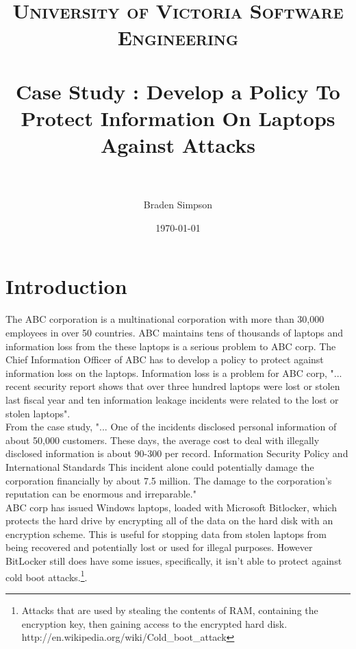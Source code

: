 \documentclass[paper=a4, fontsize=11pt]{scrartcl} %
\title{	
\normalfont \normalsize 
\textsc{University of Victoria Software Engineering} \\ [25pt] %
\horrule{0.5pt} \\[0.4cm] %
\huge Case Study : Develop a Policy To Protect Information On Laptops Against Attacks  \\ %
\horrule{2pt} \\[0.5cm] %
}
\author{Braden Simpson} %
\date{\normalsize\today} %
\numberwithin{equation}{section} %
\numberwithin{figure}{section} %
\numberwithin{table}{section} %
\begin{document}
\maketitle %


\section{Introduction}

The ABC corporation is a multinational corporation with more than 30,000 employees in over 50 countries.  ABC maintains tens of thousands of laptops and information loss from the these laptops is a serious problem to ABC corp.  The Chief Information Officer of ABC has to develop a policy to protect against information loss on the laptops.  Information loss is a problem for ABC corp, "...  recent security report shows that over three 
hundred laptops were lost or stolen last fiscal year and ten information leakage incidents 
were related to the lost or stolen laptops".\\

From the case study, "... One of the incidents disclosed personal information of about 50,000 customers. These days, 
the average cost to deal with illegally disclosed information is about 90-300 per record. Information Security Policy and International Standards This incident alone could potentially damage the corporation financially by about 7.5 million. The damage to the corporation's reputation can be enormous and irreparable."\\  

ABC corp has issued Windows laptops, loaded with Microsoft Bitlocker, which protects the hard drive by encrypting all of the data on the hard disk with an encryption scheme.  This is useful for stopping data from stolen laptops from being recovered and potentially lost or used for illegal purposes.  However BitLocker still does have some issues, specifically, it isn't able to protect against cold boot attacks.\footnote{Attacks that are used by stealing the contents of RAM, containing the encryption key, then gaining access to the encrypted hard disk.  http://en.wikipedia.org/wiki/Cold\_boot\_attack}.\\

\end{document}

